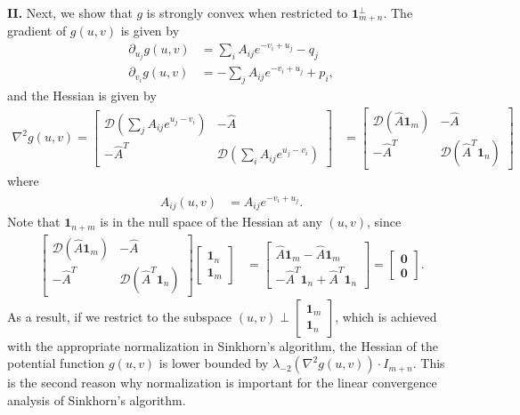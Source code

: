 \textbf{II.} Next, we show that $g$ is strongly convex when restricted to $ \mathbf{1}_{m+n}^\perp$. The gradient of $g(u,v)$ is given by 
\begin{align*}
\partial_{u_{j}}g(u,v) & =\sum_{i}A_{ij}e^{-v_{i}+u_{j}}-q_{j}\\
\partial_{v_{i}}g(u,v) & =-\sum_{j}A_{ij}e^{-v_{i}+u_{j}}+p_{i},
\end{align*}
and the Hessian is given by 
\begin{align*}
\nabla^{2}g(u,v)=\begin{bmatrix}\mathcal{D}(\sum_{j}A_{ij}e^{u_{j}-v_{i}}) & -\hat{A}\\
-\hat{A}^{T} & \mathcal{D}(\sum_{i}A_{ij}e^{u_{j}-v_{i}})
\end{bmatrix} & =\begin{bmatrix}\mathcal{D}(\hat{A}\mathbf{1}_{m}) & -\hat{A}\\
-\hat{A}^{T} & \mathcal{D}(\hat{A}^{T}\mathbf{1}_{n})
\end{bmatrix}
\end{align*}
 where 
\begin{align*}
\hat{A}_{ij}(u,v) & =A_{ij}e^{-v_{i}+u_{j}}.
\end{align*}
Note that $\mathbf{1}_{n+m}$ is in the null space of the Hessian
at any $(u,v)$, since
\begin{align*}
\begin{bmatrix}\mathcal{D}(\hat{A}\mathbf{1}_{m}) & -\hat{A}\\
-\hat{A}^{T} & \mathcal{D}(\hat{A}^{T}\mathbf{1}_{n})
\end{bmatrix}\begin{bmatrix}\mathbf{1}_{n}\\
\mathbf{1}_{m}
\end{bmatrix} & =\begin{bmatrix}\hat{A}\mathbf{1}_{m}-\hat{A}\mathbf{1}_{m}\\
-\hat{A}^{T}\mathbf{1}_{n}+\hat{A}^{T}\mathbf{1}_{n}
\end{bmatrix}=\begin{bmatrix}\mathbf{0}\\
\mathbf{0}
\end{bmatrix}.
\end{align*}
As a result, if we restrict to the subspace $(u,v)\perp\begin{bmatrix}\mathbf{1}_{m}\\
\mathbf{1}_{n}
\end{bmatrix}$, which is achieved with the appropriate normalization in Sinkhorn's
algorithm, the Hessian of the potential function $g(u,v)$ is lower
bounded by $\lambda_{-2}(\nabla^{2}g(u,v))\cdot I_{m+n}$. This is the second reason why normalization is important for the linear convergence analysis of Sinkhorn's algorithm.

